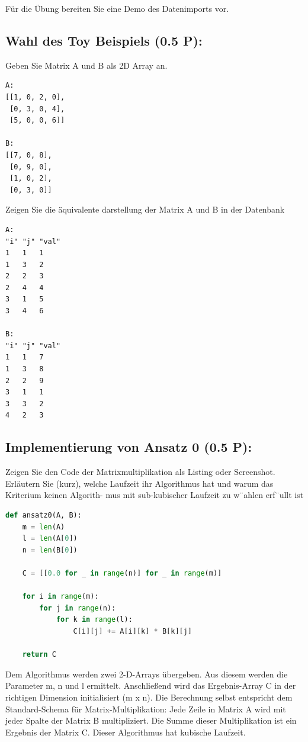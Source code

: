 \documentclass[11pt]{scrartcl}
\begin{document}
Für die Übung bereiten Sie eine Demo des Datenimports vor.


\subsection*{Wahl des Toy Beispiels (0.5 P):}

Geben Sie Matrix A und B als 2D Array an.

\begin{lstlisting}[style=dmrsql]
A:
[[1, 0, 2, 0], 
 [0, 3, 0, 4], 
 [5, 0, 0, 6]]

B:
[[7, 0, 8], 
 [0, 9, 0], 
 [1, 0, 2], 
 [0, 3, 0]]
\end{lstlisting}

Zeigen Sie die äquivalente darstellung der Matrix A und B in der Datenbank

\begin{lstlisting}[style=dmrsql]
A:
"i"	"j"	"val"
1	1	1
1	3	2
2	2	3
2	4	4
3	1	5
3	4	6

B:
"i"	"j"	"val"
1	1	7
1	3	8
2	2	9
3	1	1
3	3	2
4	2	3
\end{lstlisting}

\subsection*{Implementierung von Ansatz 0 (0.5 P):}
Zeigen Sie den Code der Matrixmultiplikation als Listing oder Screenshot. Erläutern Sie
(kurz), welche Laufzeit ihr Algorithmus hat und warum das Kriterium keinen Algorith-
mus mit sub-kubischer Laufzeit zu w¨ahlen erf¨ullt ist

\begin{lstlisting}[language=Python]
def ansatz0(A, B):
    m = len(A)
    l = len(A[0])
    n = len(B[0])

    C = [[0.0 for _ in range(n)] for _ in range(m)]

    for i in range(m):
        for j in range(n):
            for k in range(l):
                C[i][j] += A[i][k] * B[k][j]

    return C
\end{lstlisting}

Dem Algorithmus werden zwei 2-D-Arrays übergeben. Aus diesem werden die Parameter m, n und l ermittelt. Anschließend wird das Ergebnis-Array C in der richtigen Dimension initialisiert (m x n). Die Berechnung selbst entspricht dem Standard-Schema für Matrix-Multiplikation: Jede Zeile in Matrix A wird mit jeder Spalte der Matrix B multipliziert. Die Summe dieser Multiplikation ist ein Ergebnis der Matrix C. Dieser Algorithmus hat kubische Laufzeit.
\end{document}
